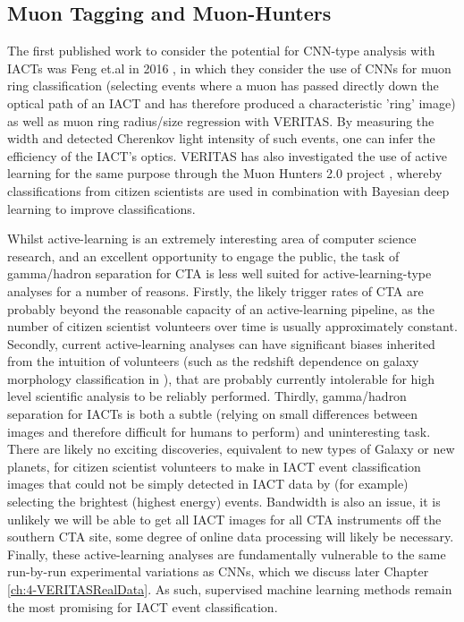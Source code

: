 \subsection{Muon Tagging and Muon-Hunters}
The first published work to consider the potential for CNN-type analysis with IACTs was Feng et.al in 2016 \cite{feng2016}, in which they consider the use of CNNs for muon ring classification (selecting events where a muon has passed directly down the optical path of an IACT and has therefore produced a characteristic 'ring' image) as well as muon ring radius/size regression with VERITAS. By measuring the width and detected Cherenkov light intensity of such events, one can infer the efficiency of the IACT's optics. VERITAS has also investigated the use of active learning for the same purpose through the Muon Hunters 2.0 project \cite{muonhunters2}, whereby classifications from citizen scientists are used in combination with Bayesian deep learning to improve classifications.

Whilst active-learning is an extremely interesting area of computer science research, and an excellent opportunity to engage the public, the task of gamma/hadron separation for CTA is less well suited for active-learning-type analyses for a number of reasons. Firstly, the likely trigger rates \cite{trigrate} of CTA are probably beyond the reasonable capacity of an active-learning pipeline, as the number of citizen scientist volunteers over time is usually approximately constant. Secondly, current active-learning analyses can have significant biases inherited from the intuition of volunteers (such as the redshift dependence on galaxy morphology classification in \cite{mike}), that are probably currently intolerable for high level scientific analysis to be reliably performed. Thirdly, gamma/hadron separation for IACTs is both a subtle (relying on small differences between images and therefore difficult for humans to perform) and uninteresting task. There are likely no exciting discoveries, equivalent to new types of Galaxy or new planets, for citizen scientist volunteers to make in IACT event classification images that could not be simply detected in IACT data by (for example) selecting the brightest (highest energy) events. Bandwidth is also an issue, it is unlikely we will be able to get all IACT images for all CTA instruments off the southern CTA site, some degree of online data processing will likely be necessary. Finally, these active-learning analyses are fundamentally vulnerable to the same run-by-run experimental variations as CNNs, which we discuss later Chapter \ref{ch:4-VERITASRealData}. As such, supervised machine learning methods remain the most promising for IACT event classification.

